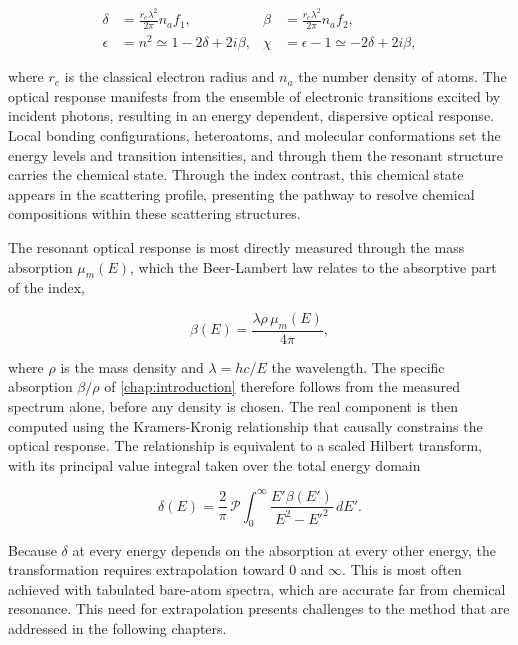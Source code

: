 \begin{align}
  \delta &= \frac{r_{e}\lambda^{2}}{2\pi}n_{a}f_{1}, & \beta &= \frac{r_{e}\lambda^{2}}{2\pi}n_{a}f_{2}, \label{eq:delta-beta}\\
  \epsilon &= n^{2} \simeq 1 - 2\delta + 2i\beta, & \chi &= \epsilon - 1 \simeq - 2\delta + 2i\beta, \label{eq:epsilon-chi}
\end{align}

where \(r_{e}\) is the classical electron radius and \(n_{a}\) the number density of atoms.\autocite{attwoodSoftXRaysExtreme1999} The optical response manifests from the ensemble of electronic transitions excited by incident photons, resulting in an energy dependent, dispersive optical response. Local bonding configurations, heteroatoms, and molecular conformations set the energy levels and transition intensities, and through them the resonant structure carries the chemical state. Through the index contrast, this chemical state appears in the scattering profile, presenting the pathway to resolve chemical compositions within these scattering structures.

The resonant optical response is most directly measured through the mass absorption \(\mu_{m}(E)\), which the Beer-Lambert law relates to the absorptive part of the index,

\begin{equation}
  \beta(E) = \frac{\lambda\rho\,\mu_{m}(E)}{4\pi},
  \label{eq:beta-mu}
\end{equation}

where \(\rho\) is the mass density and \(\lambda = hc/E\) the wavelength. The specific absorption \(\beta/\rho\) of \cref{chap:introduction} therefore follows from the measured spectrum alone, before any density is chosen. The real component is then computed using the Kramers-Kronig relationship that causally constrains the optical response. The relationship is equivalent to a scaled Hilbert transform, with its principal value integral taken over the total energy domain

\begin{equation}
  \delta(E) = \frac{2}{\pi}\,\mathcal{P}\int_{0}^{\infty}\frac{E'\beta(E')}{E^{2} - E'^{2}}\, dE'.
  \label{eq:kk-delta}
\end{equation}

Because \(\delta\) at every energy depends on the absorption at every other energy, the transformation requires extrapolation toward 0 and \(\infty\). This is most often achieved with tabulated bare-atom spectra, which are accurate far from chemical resonance.\autocite{henkeXRayInteractionsPhotoabsorption1993} This need for extrapolation presents challenges to the method that are addressed in the following chapters.

